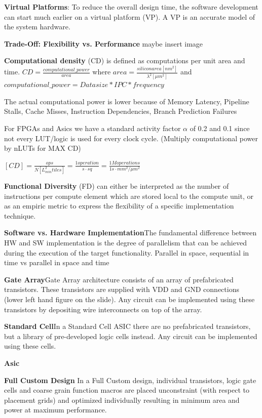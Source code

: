 \documentclass[english]{latex4ei/latex4ei_sheet}
\begin{document}
\textbf{Virtual Platforms}: To reduce the overall design time, the software development can start much earlier on a virtual platform (VP). A VP is an accurate model of the system hardware.

\textbf{Trade-Off: Flexibility vs. Performance} maybe insert image

\textbf{Computational density} (CD) is defined as computations per unit area and time. 
$CD = \frac{computational\_power}{area}$ where $area = \frac{siliconarea [nm^2]}{\lambda^2 [\mu m^2]}$ and $computational\_power = Data size * IPC * frequency$

The actual computational power is lower because of Memory Latency, Pipeline Stalls, Cache Misses, Instruction Dependencies, Branch Prediction Failures

For FPGAs and Asics we have a standard activity factor $\alpha$ of 0.2 and 0.1 since not every LUT/logic is used for every clock cycle. (Multiply computational power by nLUTs for MAX CD)

$[CD] = \frac{ops}{N [L_{min}^2 tiles]} = \frac{1 operation}{s \cdot sq} 
= \frac{1M operations}{1s \cdot mm^2 / \mu m^2}$

\textbf{Functional Diversity} (FD) can either be interpreted as the number of instructions per compute element which are stored local to the compute unit, or as an empiric metric to express the flexibility of a specific implementation technique.
 
\textbf{Software vs. Hardware Implementation}The fundamental difference between HW and SW implementation is the degree of parallelism that can be achieved during the execution of the target functionality. Parallel in space, sequential in time vs parallel in space and time

\textbf{Gate Array}Gate Array architecture consists of an array of prefabricated transistors. These transistors are supplied with VDD and GND connections (lower left hand figure on the slide). Any circuit can be implemented using these transistors by depositing wire interconnects on top of the array.

\textbf{Standard Cell}In a Standard Cell ASIC there are no prefabricated transistors, but a library of pre-developed logic cells instead. Any circuit can be implemented using these cells.

\textbf{Asic}

\textbf{Full Custom Design}
In a Full Custom design, individual transistors, logic gate cells and coarse grain function macros are placed unconstraint (with respect to placement grids) and optimized individually resulting in minimum area and power at maximum performance.
\end{document}
